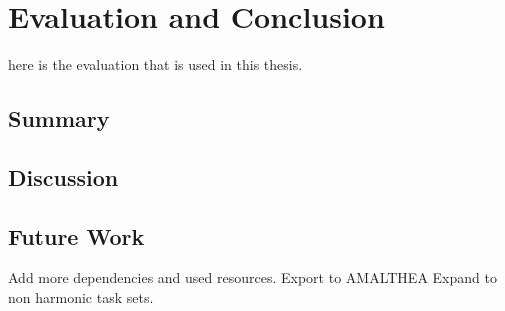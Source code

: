 \chapter{Evaluation and Conclusion}
here is the evaluation that is used in this thesis.

\section{Summary}

\section{Discussion}

\section{Future Work}
Add more dependencies and used resources.
Export to AMALTHEA
Expand to non harmonic task sets.
